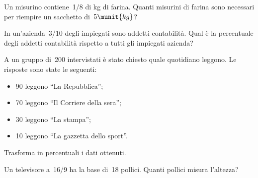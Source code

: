 \begin{htmulticols}{2}
\begin{esercizio}
\label{ese:3.183}
 Un misurino contiene~1/8 di kg di farina. Quanti misurini di farina
sono necessari per riempire un sacchetto di~\(5\munit{kg}\)? \sol{\dots}
\end{esercizio}

% 
% 

\begin{esercizio}
\label{ese:3.187}
 In un'azienda~3/10 degli impiegati sono addetti
contabilità. Qual è la percentuale degli addetti contabilità
rispetto a tutti gli impiegati azienda? \sol{\dots}
\end{esercizio}

\begin{esercizio}
\label{ese:3.188}
 A un gruppo di~200 intervistati è stato chiesto quale quotidiano
leggono. Le risposte sono state le seguenti:
\begin{itemize} [nosep]
\item 90 leggono ``La Repubblica'';
\item 70 leggono ``Il Corriere della sera'';
\item 30 leggono ``La stampa'';
\item 10 leggono ``La gazzetta dello sport''.
\end{itemize}
Trasforma in percentuali i dati ottenuti. \sol{\dots}
\end{esercizio}

\begin{esercizio}
\label{ese:3.196}
Un televisore a~16/9 ha la base di~18 pollici. Quanti
pollici misura l'altezza? \sol{\dots}
\end{esercizio}


\end{htmulticols}
